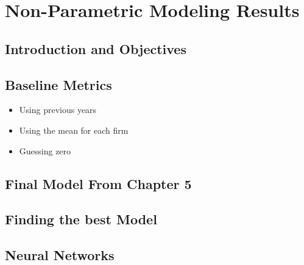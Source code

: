 \chapter{Non-Parametric Modeling Results}

\section{Introduction and Objectives}

\section{Baseline Metrics}

\begin{itemize}
    \item Using previous years
    \item Using the mean for each firm
    \item Guessing zero
\end{itemize}

\section{Final Model From Chapter 5}

\section{Finding the best Model}

\section{Neural Networks}